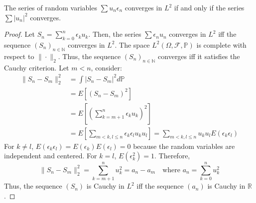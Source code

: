 \begin{proposition}
The series of random variables $\sum u_n \epsilon_n$ converges in $L^2$ if and only if the series $\sum |u_n|^2$ converges.
\end{proposition}
\begin{proof}
Let $S_n = \sum_{k=0}^n \epsilon_k u_k$.
Then, the series $\sum \epsilon_n u_n$ converges in $L^2$ iff the sequence $(S_n)_{n \in \mathbb{N}}$ converges in $L^2$.
The space $L^2(\Omega, \mathcal{F}, \mathbb{P})$ is complete with respect to $\| \cdot \|_2$.
Thus, the sequence $(S_n)_{n \in \mathbb{N}}$ converges iff it satisfies the Cauchy criterion.
Let $m<n$, consider:
\begin{align*}
    \|S_n - S_m\|_2^2 &= \int |S_n - S_m|^2 d\mathbb{P} \\
    &= E[(S_n-S_m)^2] \\
    &= E\left[\left(\sum_{k=m+1}^n \epsilon_k u_k\right)^2\right] \\
    &= E\left[\sum_{m<k,l \le n} \epsilon_k \epsilon_l u_k u_l\right] = \sum_{m<k,l \le n} u_k u_l E(\epsilon_k \epsilon_l)
\end{align*}
For $k \neq l$, $E(\epsilon_k \epsilon_l) = E(\epsilon_k)E(\epsilon_l) = 0$ because the random variables are independent and centered. For $k=l$, $E(\epsilon_k^2)=1$.
Therefore,
\[ \|S_n - S_m\|_2^2 = \sum_{k=m+1}^n u_k^2 = a_n - a_m \quad \text{where } a_n = \sum_{k=0}^n u_k^2 \]
Thus, the sequence $(S_n)$ is Cauchy in $L^2$ iff the sequence $(a_n)$ is Cauchy in $\mathbb{R}$.
\end{proof}%

